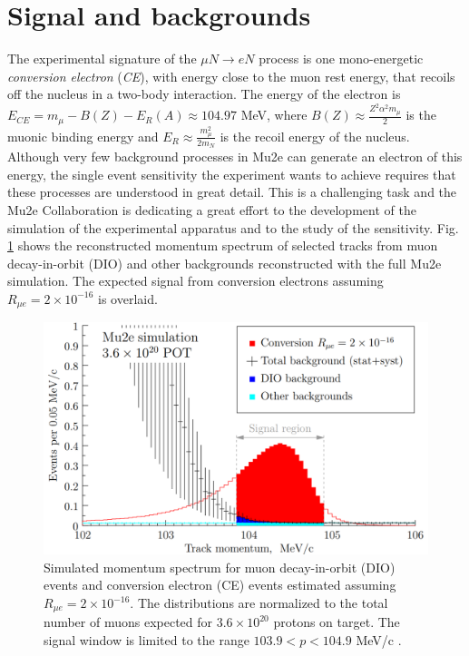 \documentclass[12pt,a4paper,openright, oneside, titlepage]{book} %
\begin{document}



\section{Signal and backgrounds}

The experimental signature of the $\mu N \rightarrow eN$ process is one mono-energetic  \textit{conversion electron} (\textit{CE}), with energy close to the muon rest energy, that recoils off the nucleus in a two-body interaction.
The energy of the electron is $E_{CE} = m_\mu -B(Z) -E_R(A) \approx 104.97$ MeV, where  $B(Z)\approx\frac{Z^2\alpha^2m_\mu}{2}$ is the muonic binding energy  and $E_R\approx\frac{m_\mu^2}{2m_N}$ is the recoil energy of the nucleus.
Although very few background processes in Mu2e can generate an electron of this energy, the single event sensitivity the experiment wants to achieve requires that these processes are understood in great detail. 
This is a challenging task and the Mu2e Collaboration is dedicating a great effort to the development of the simulation of the experimental apparatus and to the study of the sensitivity. 
Fig. \ref{_signal_bg} shows the reconstructed momentum spectrum of selected tracks from muon decay-in-orbit (DIO) and other backgrounds reconstructed with the full Mu2e simulation. 
The expected signal from conversion electrons assuming $R_{\mu e} = 2 \times 10^{-16}$ is overlaid. 

\begin{figure}[h!]
\centering
\includegraphics[scale=0.6]{signal_bg}
\caption{Simulated momentum spectrum for muon decay-in-orbit (DIO) events and conversion electron (CE) events estimated assuming $R_{\mu e} = 2 \times 10 ^{-16}$. 
The distributions are normalized to the total number of muons expected for $3.6 \times 10^{20}$ protons on target. 
The signal window is limited to the range $103.9 < p < 104.9$ MeV/c \cite{Manolis} \cite{CD3}.}
\label{_signal_bg}
\end{figure}
\end{document}

